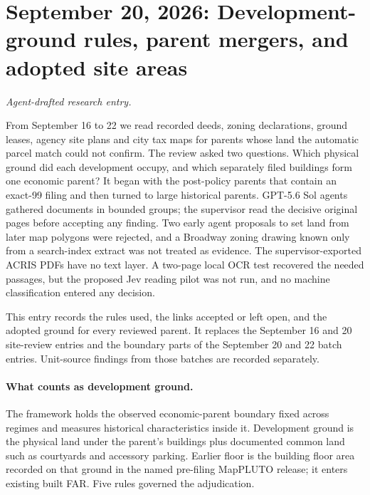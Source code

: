 \clearpage
\section*{September 20, 2026: Development-ground rules, parent mergers, and adopted site areas}
\textit{Agent-drafted research entry.}

From September 16 to 22 we read recorded deeds, zoning declarations, ground
leases, agency site plans and city tax maps for parents whose land the
automatic parcel match could not confirm. The review asked two questions.
Which physical ground did each development occupy, and which separately filed
buildings form one economic parent? It began with the post-policy parents that
contain an exact-99 filing and then turned to large historical parents.
GPT-5.6 Sol agents gathered documents in bounded groups; the supervisor read
the decisive original pages before accepting any finding. Two early agent
proposals to set land from later map polygons were rejected, and a Broadway
zoning drawing known only from a search-index extract was not treated as
evidence. The supervisor-exported ACRIS PDFs have no text layer. A two-page
local OCR test recovered the needed passages, but the proposed Jev reading
pilot was not run, and no machine classification entered any decision.

This entry records the rules used, the links accepted or left open, and the
adopted ground for every reviewed parent. It replaces the September 16 and 20
site-review entries and the boundary parts of the September 20 and 22 batch
entries. Unit-source findings from those batches are recorded separately.

\paragraph{What counts as development ground.}
The framework holds the observed economic-parent boundary fixed across
regimes and measures historical characteristics inside it. Development ground
is the physical land under the parent's buildings plus documented common land
such as courtyards and accessory parking. Earlier floor is the building floor
area recorded on that ground in the named pre-filing MapPLUTO release; it
enters existing built FAR. Five rules governed the adjudication.

